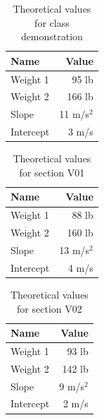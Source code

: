 %
\begin{table}[ht]
    \centering
    \begin{tabular}{l|r}
        \textbf{Name} & \textbf{Value} \\
        \hline
        Weight 1 & 95 lb \\
        Weight 2 & 166 lb \\
        \hline
        Slope & 11 m/s$^{2}$ \\
        Intercept & 3 m/s \\
        \hline
    \end{tabular}
    \caption{Theoretical values for class demonstration}
    \label{table:00.theoretical.demo}
\end{table}
%
\begin{table}[ht]
    \centering
    \begin{tabular}{l|r}
        \textbf{Name} & \textbf{Value} \\
        \hline
        Weight 1 & 88 lb \\
        Weight 2 & 160 lb \\
        \hline
        Slope & 13 m/s$^{2}$ \\
        Intercept & 4 m/s \\
        \hline
    \end{tabular}
    \caption{Theoretical values for section V01}
    \label{table:00.theoretical.v01}
\end{table}
%
\begin{table}[ht]
    \centering
    \begin{tabular}{l|r}
        \textbf{Name} & \textbf{Value} \\
        \hline
        Weight 1 & 93 lb \\
        Weight 2 & 142 lb \\
        \hline
        Slope & 9 m/s$^{2}$ \\
        Intercept & 2 m/s \\
        \hline
    \end{tabular}
    \caption{Theoretical values for section V02}
    \label{table:00.theoretical.v02}
\end{table}
\newpage
%
